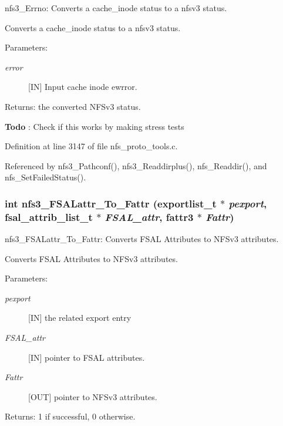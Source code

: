 nfs3\_\-Errno: Converts a cache\_\-inode status to a nfsv3 status.

Converts a cache\_\-inode status to a nfsv3 status.

\begin{Desc}
\item[Parameters:]
\begin{description}
\item[{\em error}][IN] Input cache inode ewrror.\end{description}
\end{Desc}
\begin{Desc}
\item[Returns:]the converted NFSv3 status.\end{Desc}


\begin{Desc}
\item[{\bf Todo}]: Check if this works by making stress tests\end{Desc}


Definition at line 3147 of file nfs\_\-proto\_\-tools.c.

Referenced by nfs3\_\-Pathconf(), nfs3\_\-Readdirplus(), nfs\_\-Readdir(), and nfs\_\-Set\-Failed\-Status().
\subsubsection{\setlength{\rightskip}{0pt plus 5cm}int nfs3\_\-FSALattr\_\-To\_\-Fattr (exportlist\_\-t $\ast$ {\em pexport}, fsal\_\-attrib\_\-list\_\-t $\ast$ {\em FSAL\_\-attr}, fattr3 $\ast$ {\em Fattr})}\label{nfs__proto__tools_8c_a18}


nfs3\_\-FSALattr\_\-To\_\-Fattr: Converts FSAL Attributes to NFSv3 attributes.

Converts FSAL Attributes to NFSv3 attributes.

\begin{Desc}
\item[Parameters:]
\begin{description}
\item[{\em pexport}][IN] the related export entry \item[{\em FSAL\_\-attr}][IN] pointer to FSAL attributes. \item[{\em Fattr}][OUT] pointer to NFSv3 attributes.\end{description}
\end{Desc}
\begin{Desc}
\item[Returns:]1 if successful, 0 otherwise. \end{Desc}


